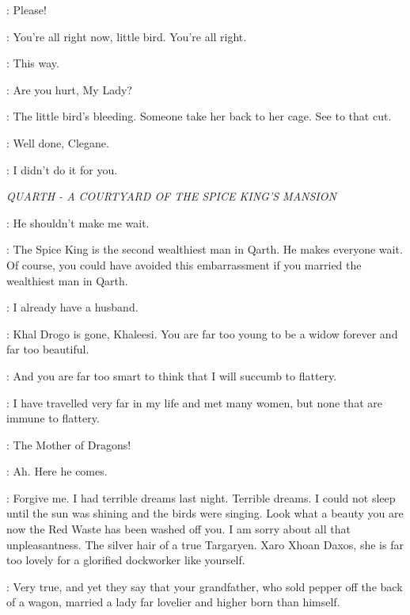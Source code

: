\RIOTERb: Please! 

\HOUND: You're all right now, little bird. You're all right.


\HOUND: This way.

\TYRION: Are you hurt, My Lady?


\HOUND: The little bird's bleeding. Someone take her back to her cage.  See to that cut. 

\TYRION: Well done, Clegane. 

\HOUND: I didn't do it for you. 


\scene

\textit{QUARTH - A COURTYARD OF THE SPICE KING'S MANSION}


\DAENERYS: He shouldn't make me wait. 

\XARO: The Spice King is the second wealthiest man in Qarth. He makes everyone wait. Of course, you could have avoided this embarrassment if you married the wealthiest man in Qarth. 

\DAENERYS: I already have a husband. 

\XARO: Khal Drogo is gone, Khaleesi. You are far too young to be a widow forever and far too beautiful. 

\DAENERYS: And you are far too smart to think that I will succumb to flattery. 

\XARO: I have travelled very far in my life and met many women, but none that are immune to flattery. 


\SPICEKING: The Mother of Dragons! 

\XARO: Ah. Here he comes. 

\SPICEKING: Forgive me. I had terrible dreams last night. Terrible dreams. I could not sleep until the sun was shining and the birds were singing. Look what a beauty you are now the Red Waste has been washed off you. I am sorry about all that unpleasantness. The silver hair of a true Targaryen. Xaro Xhoan Daxos, she is far too lovely for a glorified dockworker like yourself. 

\XARO: Very true, and yet they say that your grandfather, who sold pepper off the back of a wagon, married a lady far lovelier and higher born than himself. 

